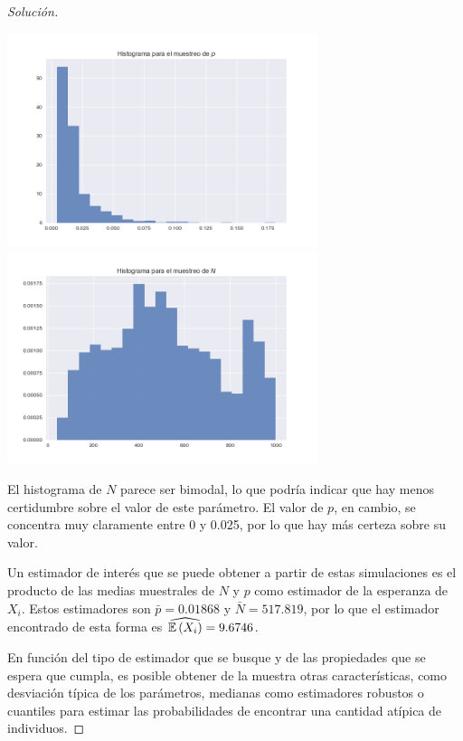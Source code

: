 \documentclass{article}
\begin{document}
\begin{enumerate}
\begin{proof}[Solución]
        \begin{center}
            \includegraphics[width=0.68\textwidth]{Tarea9/histp.png}
            \includegraphics[width=0.68\textwidth]{Tarea9/histN.png}
        \end{center}

        El histograma de $N$ parece ser bimodal, lo que podría indicar que hay menos certidumbre
        sobre el valor de este parámetro. El valor de $p$, en cambio, se concentra muy claramente
        entre 0 y 0.025, por lo que hay más certeza sobre su valor.

        Un estimador de interés que se puede obtener a partir de estas simulaciones es
        el producto de las medias muestrales de $N$ y $p$ como estimador de la esperanza
        de $X_i$. Estos estimadores son $\bar p = 0.01868$ y $\bar N = 517.819$, por lo que
        el estimador encontrado de esta forma es $\widehat{ \mathbb E \left( X_i \right) } = 9.6746$.

        En función del tipo de estimador que se busque y de las propiedades que se espera
        que cumpla, es posible obtener de la muestra otras características, como desviación
        típica de los parámetros, medianas como estimadores robustos o cuantiles para estimar
        las probabilidades de encontrar una cantidad atípica de individuos.





\end{proof}
\end{enumerate}
\end{document}
